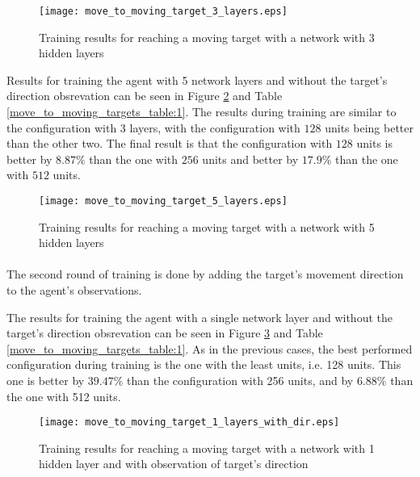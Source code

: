 \begin{figure}
    \begin{center}
        \texttt{[image: move\_to\_moving\_target\_3\_layers.eps]}
        \caption{Training results for reaching a moving target with a network with 3 hidden layers}
        \label{train_results_moving_3_layers}
    \end{center}
\end{figure}


Results for training the agent with 5 network layers and without the target's direction obsrevation can be seen in Figure \ref{train_results_moving_5_layers} and Table \ref{move_to_moving_targets_table:1}. The results during training are similar to the configuration with 3 layers, with the configuration with $128$ units being better than the other two. The final result is that the configuration with $128$ units is better by $8.87\%$ than the one with $256$ units and better by $17.9\%$ than the one with $512$ units.

\begin{figure}
    \begin{center}
        \texttt{[image: move\_to\_moving\_target\_5\_layers.eps]}
        \caption{Training results for reaching a moving target with a network with 5 hidden layers}
        \label{train_results_moving_5_layers}
    \end{center}
\end{figure}


\paragraph{}
The second round of training is done by adding the target's movement direction to the agent's observations.

The results for training the agent with a single network layer and without the target's direction obsrevation can be seen in Figure \ref{train_results_moving_1_layers_with_dir} and Table \ref{move_to_moving_targets_table:1}. As in the previous cases, the best performed configuration during training is the one with the least units, i.e. 128 units. This one is better by $39.47\%$ than the configuration with 256 units, and by $6.88\%$ than the one with 512 units.

\begin{figure}
    \begin{center}
        \texttt{[image: move\_to\_moving\_target\_1\_layers\_with\_dir.eps]}
        \caption{Training results for reaching a moving target with a network with 1 hidden layer and with observation of target's direction}
        \label{train_results_moving_1_layers_with_dir}
    \end{center}
\end{figure}

